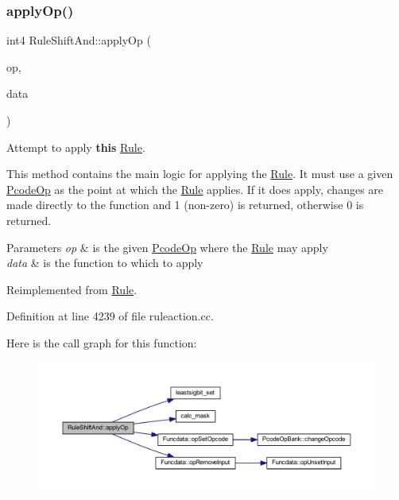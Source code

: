 \subsubsection{\texorpdfstring{applyOp()}{applyOp()}}
{\footnotesize\ttfamily int4 Rule\+Shift\+And\+::apply\+Op (\begin{DoxyParamCaption}\item[{\mbox{\hyperlink{class_pcode_op}{Pcode\+Op}} $\ast$}]{op,  }\item[{\mbox{\hyperlink{class_funcdata}{Funcdata}} \&}]{data }\end{DoxyParamCaption})\hspace{0.3cm}{\ttfamily [virtual]}}



Attempt to apply {\bfseries{this}} \mbox{\hyperlink{class_rule}{Rule}}. 

This method contains the main logic for applying the \mbox{\hyperlink{class_rule}{Rule}}. It must use a given \mbox{\hyperlink{class_pcode_op}{Pcode\+Op}} as the point at which the \mbox{\hyperlink{class_rule}{Rule}} applies. If it does apply, changes are made directly to the function and 1 (non-\/zero) is returned, otherwise 0 is returned. 
\begin{DoxyParams}{Parameters}
{\em op} & is the given \mbox{\hyperlink{class_pcode_op}{Pcode\+Op}} where the \mbox{\hyperlink{class_rule}{Rule}} may apply \\
\hline
{\em data} & is the function to which to apply \\
\hline
\end{DoxyParams}


Reimplemented from \mbox{\hyperlink{class_rule_a4e3e61f066670175009f60fb9dc60848}{Rule}}.



Definition at line 4239 of file ruleaction.\+cc.

Here is the call graph for this function\+:
\nopagebreak
\begin{figure}[H]
\begin{center}
\leavevmode
\includegraphics[width=350pt]{class_rule_shift_and_a46abea946abb40fa7bed25e4157d0f13_cgraph}
\end{center}
\end{figure}
\mbox{\label{class_rule_shift_and_a3afbafd2204add57aded444eea904f56}} 
